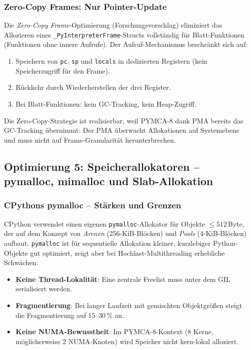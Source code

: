 ﻿\documentclass[a4paper,12pt]{scrreprt}
\theoremstyle{definition}
\begin{document}
	\subsubsection{Zero-Copy Frames: Nur Pointer-Update}
	
	Die \emph{Zero-Copy Frame}-Optimierung (Forschungsvorschlag) eliminiert
	das Allozieren eines \texttt{\_PyInterpreterFrame}-Structs vollständig
	für Blatt-Funktionen (Funktionen ohne innere Aufrufe). Der
	Aufruf-Mechanismus beschränkt sich auf:
	\begin{enumerate}[noitemsep]
		\item Speichern von \texttt{pc}, \texttt{sp} und \texttt{locals} in
		dedizierten Registern (kein Speicherzugriff für den Frame).
		\item Rückkehr durch Wiederherstellen der drei Register.
		\item Bei Blatt-Funktionen: kein GC-Tracking, kein Heap-Zugriff.
	\end{enumerate}
	Die Zero-Copy-Strategie ist realisierbar, weil PYMCA-8 dank PMA
	bereits das GC-Tracking übernimmt: Der PMA überwacht Allokationen
	auf Systemebene und muss nicht auf Frame-Granularität herunterbrechen.
	
	\subsection{Optimierung 5: Speicherallokatoren -- pymalloc, mimalloc und Slab-Allokation}
	
	\subsubsection{CPythons pymalloc -- Stärken und Grenzen}
	
	CPython verwendet einen eigenen \texttt{pymalloc}-Allokator für
	Objekte $\le 512$\,Byte, der auf dem Konzept von
	\emph{Arenen} (256-KiB-Blöcken) und \emph{Pools} (4-KiB-Blöcken)
	aufbaut. \texttt{pymalloc} ist für sequentielle Allokation kleiner,
	kurzlebiger Python-Objekte gut optimiert, zeigt aber bei
	Hochlast-Multithreading erhebliche Schwächen:
	
	\begin{itemize}[noitemsep]
		\item \textbf{Keine Thread-Lokalität}: Eine zentrale Freelist
		muss unter dem GIL serialisiert werden.
		\item \textbf{Fragmentierung}: Bei langer Laufzeit mit gemischten
		Objektgrößen steigt die Fragmentierung auf 15--30\,\% an.
		\item \textbf{Keine NUMA-Bewusstheit}: Im PYMCA-8-Kontext
		(8 Kerne, möglicherweise 2 NUMA-Knoten) wird Speicher
		nicht kern-lokal alloziert.
	\end{itemize}
	
\end{document}
